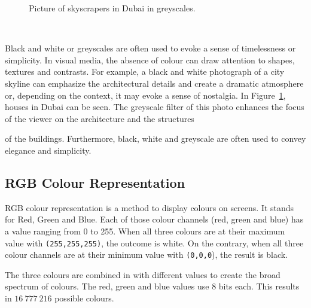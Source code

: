 \documentclass[../MasterThesis.tex]{subfiles}
\begin{document}
\begin{minipage}{0.5\textwidth}
	\begin{figure}[H]
	\begin{center}
		\caption[Picture of skyscrapers in Dubai in greyscales.]{Picture of skyscrapers in Dubai in greyscales.}
		\label{figure:gray}
	\end{center}
\end{figure}\hfill
\end{minipage}\begin{minipage}{0.05\textwidth}
	\ 
\end{minipage}\begin{minipage}{0.45\textwidth}
	Black and white or greyscales are often used to evoke a sense of timelessness or simplicity. In visual media, the absence of colour can draw attention to shapes, textures and contrasts. For example, a black and white photograph of a city skyline can emphasize the architectural details and create a dramatic atmosphere or, depending on the context, it may evoke a sense of nostalgia.
	In Figure~\ref{figure:gray}, houses in Dubai can be seen. The greyscale filter of this photo enhances the focus of the viewer on the architecture and the structures

	
\end{minipage}

\vspace*{-0.6em}
 of the buildings. Furthermore, black, white and greyscale are often used to convey elegance and simplicity.~\cite{colour2}


%





\subsection{RGB Colour Representation}
\label{subsection:RGB}


RGB colour representation is a method to display colours on screens. It stands for Red, Green and Blue. 
Each of those colour channels (red, green and blue) has a value ranging from 0 to 255. When all three colours are at their maximum value with \texttt{(255,255,255)}, the outcome is white. On the contrary, when all three colour channels are at their minimum value with \texttt{(0,0,0}), the result is black.~\cite{colourRGB}

The three colours are combined in with different values to create the broad spectrum of colours. The red, green and blue values use 8 bits each. This results in $16\ 777\ 216$ possible colours.
\end{document}
